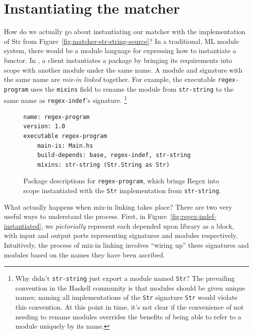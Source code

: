 \section{Instantiating the matcher}

How do we actually go about instantiating our matcher with the
implementation of Str from Figure~\ref{fig:matcher-str-string-source}?
In a traditional, ML module system, there would be a module language for
expressing how to instantiate a functor.
In \Backpack{}, a client instantiates a package by bringing its
requirements into scope with another module under the same name.  A
module and signature with the same name are \emph{mix-in linked}
together.  For example, the executable \verb|regex-program| uses the
\verb|mixins| field to rename the module from \verb|str-string| to the
same name as \verb|regex-indef|'s signature.%
%
\footnote{Why didn't \texttt{str-string} just export
a module named \texttt{Str}?  The prevailing convention in the Haskell
community is that modules should be given unique names; naming all
implementations of the \texttt{Str} signature \texttt{Str} would violate
this convention.  At this point in time, it's not clear if the
convenience of not needing to rename modules overrides the benefits of
being able to refer to a module uniquely by its name.}

\begin{figure}
\begin{verbatim}
name: regex-program
version: 1.0
executable regex-program
    main-is: Main.hs
    build-depends: base, regex-indef, str-string
    mixins: str-string (Str.String as Str)
\end{verbatim}
\caption{Package descriptions for \texttt{regex-program}, which brings
Regex into scope instantiated with the \texttt{Str} implementation from \texttt{str-string}.}
\label{fig:matcher-functorized-packages}
\end{figure}

What actually happens when mix-in linking takes place?  There are two very useful
ways to understand the process.  First, in Figure~\ref{fig:regex-indef-instantiated}, we
\emph{pictorially} represent each depended upon library as a block, with input and output
ports representing signatures and modules respectively.  Intuitively, the process
of mix-in linking involves ``wiring up'' these signatures and modules based on the
names they have been ascribed.

